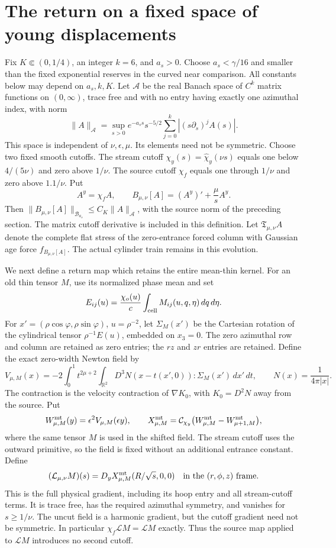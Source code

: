\section{The return on a fixed space of young displacements}

Fix $K\Subset(0,1/4)$, an integer $k=6$, and $a_s>0$.
Choose $a_s<\gamma/16$ and smaller than the fixed exponential reserves
in the curved near comparison. All constants below may depend on $a_s,k,K$.
Let $\mathscr A$ be the real Banach space of $C^k$ matrix functions on
$(0,\infty)$, trace free and with no entry having exactly one azimuthal
index, with norm
\[
 \|A\|_{\mathscr A}
 =\sup_{s>0}e^{-a_ss}s^{-5/2}
       \sum_{j=0}^k|(s\partial_s)^jA(s)|.
\]
This space is independent of $\nu,\epsilon,\mu$. Its elements need not
be symmetric. Choose two fixed smooth cutoffs. The stream cutoff
$\chi_y(s)=\widehat\chi_y(\nu s)$ equals one below $4/(5\nu)$ and
zero above $1/\nu$. The source cutoff $\chi_f$ equals one through
$1/\nu$ and zero above $1.1/\nu$. Put
\[
 A^y=\chi_f A,\qquad
 B_{\mu,\nu}[A]=(A^y)'+\frac\mu s A^y.
\]
Then $\|B_{\mu,\nu}[A]\|_{\mathscr B_{a_s}}
\le C_K\|A\|_{\mathscr A}$, with the source norm of the preceding
section. The matrix cutoff derivative is included in this definition.
Let $\mathfrak T_{\mu,\nu}A$ denote the complete flat stress of the
zero-entrance forced column with Gaussian age force $f_{B_{\mu,\nu}[A]}$.
The actual cylinder train remains in this evolution.

We next define a return map which retains the entire mean-thin kernel.
For an old thin tensor $M$, use its normalized phase mean and set
\[
 E_{ij}(u)=\frac{\chi_o(u)}c
          \int_{\rm cell}M_{ij}(u,q,\eta)\,dq\,d\eta .
\]
For $x'=(\rho\cos\varphi,\rho\sin\varphi)$, $u=\rho^{-2}$,
let $\Sigma_M(x')$ be the Cartesian rotation of the cylindrical tensor
$\rho^{-1}E(u)$, embedded on $x_3=0$. The zero azimuthal row and column
are retained as zero entries; the $rz$ and $zr$ entries are retained.
Define the exact zero-width Newton field by
\[
 V_{\mu,M}(x)=-2\int_0^1t^{2\mu+2}
       \int_{\mathbb R^2}D^3N(x-t(x',0)):\Sigma_M(x')\,dx'\,dt,
 \qquad N(x)=\frac1{4\pi|x|}.
\]
The contraction is the velocity contraction of $\nabla K_0$, with
$K_0=D^2N$ away from the source. Put
\[
 W^{\rm mt}_{\mu,M}(y)=\epsilon^2V_{\mu,M}(\epsilon y),\qquad
 X^{\rm mt}_{\mu,M}
 =\mathcal C_{\chi_y}\bigl(W^{\rm mt}_{\mu,M}
                              -W^{\rm mt}_{\mu+1,M}\bigr),
\]
where the same tensor $M$ is used in the shifted field. The stream
cutoff uses the outward primitive, so the field is fixed without an
additional entrance constant. Define
\begin{equation}\label{source-class:L}
 (\mathcal L_{\mu,\nu}M)(s)
   =D_yX^{\rm mt}_{\mu,M}(R/\sqrt s,0,0)
       \quad\hbox{in the }(r,\phi,z)\hbox{ frame}.
\end{equation}
This is the full physical gradient, including its hoop entry and all
stream-cutoff terms. It is trace free, has the required azimuthal
symmetry, and vanishes for $s\ge1/\nu$. The uncut field is a harmonic
gradient, but the cutoff gradient need not be symmetric.
In particular $\chi_f\mathcal L M=\mathcal L M$ exactly. Thus the
source map applied to $\mathcal L M$ introduces no second cutoff.

